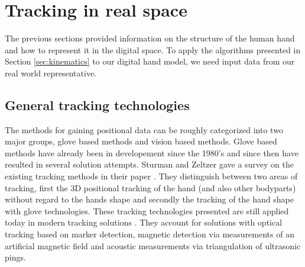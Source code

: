 \chapter{Tracking in real space}
The previous sections provided information on the structure of the human hand and how to represent it in the digital space. To apply the algorithms presented in Section \ref{sec:kinematics} to our digital hand model, we need input data from our real world representative.
\section{General tracking technologies}
\label{General tracking technologies}
The methods for gaining positional data can be roughly categorized into two major groups, glove based methods and vision based methods. Glove based methods have already been in developement since the 1980's \cite{Bolt.1980} and since then have resulted in several solution attempts. Sturman and Zeltzer gave a survey on the existing tracking methods in their paper \cite{Sturman.1994}. They distinguish between two areas of tracking, first the 3D positional tracking of the hand (and also other bodyparts) without regard to the hands shape and secondly the tracking of the hand shape with glove technologies. These tracking technologies presented are still applied today in modern tracking solutions \cite{Welch.2002,Rolland.2001}. They account for solutions with optical tracking based on marker detection, magnetic detection via measurements of an artificial magnetic field \cite{Raab.1979} and acoustic measurements via triangulation of ultrasonic pings.


